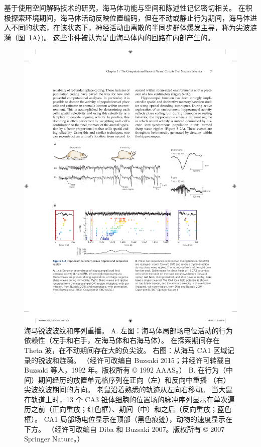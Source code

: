 基于使用空间解码技术的研究，海马体功能与空间和陈述性记忆密切相关。
在积极探索环境期间，海马体活动反映位置编码，但在不动或静止行为期间，海马体进入不同的状态，在该状态下，神经活动由离散的半同步群体爆发主导，称为尖波涟漪（图~\ref{fig:5_2}A）)。
这些事件被认为是由海马体内的回路在内部产生的。


\begin{figure}[htbp]
	\centering
	\includegraphics[width=1.0\linewidth]{chap05/fig_5_2}
	\caption{海马锐波波纹和序列重播。 
		A. 左图：海马体局部场电位活动的行为依赖性（左手和右手，左海马体和右海马体）。 
		在探索期间存在 Theta 波，在不动期间存在大的负尖波。 
		右图：从海马 CA1 区域记录的锐波和涟漪。 （经许可改编自 Buzsaki 2015；并经许可转载自 Buzsaki 等人，1992 年。版权所有 © 1992 AAAS。）
		B. 在行为（中间）期间经历的放置单元格序列在正向（左）和反向中重播 （右）尖波纹波期间的方向。 
		老鼠沿着熟悉的轨迹从左向右移动。 
		当大鼠在轨道上时，13 个 CA3 锥体细胞的位置场的脉冲序列显示在单次遍历之前（正向重放；红色框）、期间（中）和之后（反向重放；蓝色框）。 CA1 局部场电位显示在顶部（黑色痕迹），动物的速度显示在下方。 
		（经许可改编自 Diba 和 Buzsaki 2007。版权所有 © 2007 Springer Nature。）}
	\label{fig:5_2}
\end{figure}


